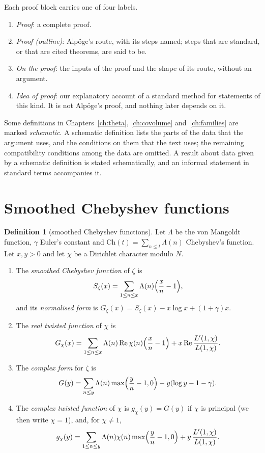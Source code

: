 \documentclass[11pt]{amsbook}
\theoremstyle{plain}
\theoremstyle{definition}
\newtheorem{definition}[theorem]{Definition}
\theoremstyle{remark}
\numberwithin{equation}{section}
\numberwithin{figure}{chapter}
\numberwithin{table}{chapter}
\newcommand{\Ch}{\mathrm{Ch}}
\newcommand{\Gz}{G_{\zeta}}
\newcommand{\Sz}{S_{\zeta}}
\begin{document}
Each proof block carries one of four labels.
\begin{enumerate}[label=(\roman*)]
\item \emph{Proof}: a complete proof.
\item \emph{Proof (outline)}: Alp\"oge's route, with its steps named;
steps that are standard, or that are cited theorems, are said to be.
\item \emph{On the proof}: the inputs of the proof and the shape of
its route, without an argument.
\item \emph{Idea of proof}: our explanatory account of a standard
method for statements of this kind. It is not Alp\"oge's proof, and
nothing later depends on it.
\end{enumerate}

Some definitions in
Chapters~\ref{ch:theta}, \ref{ch:covolume} and~\ref{ch:families}
are marked \emph{schematic}. A schematic definition lists the parts of
the data that the argument uses, and the conditions on them that the
text uses; the remaining compatibility conditions among the data are
omitted. A result about data given by a schematic definition is stated
schematically, and an informal statement in standard terms accompanies
it.

\section{Smoothed Chebyshev functions}

\begin{definition}[smoothed Chebyshev functions]\label{def:chebyshev}
Let $\Lambda$ be the von Mangoldt function, $\gamma$ Euler's constant
and $\Ch(t)=\sum_{n\le t}\Lambda(n)$ Chebyshev's function. Let $x,y>0$
and let $\chi$ be a Dirichlet character modulo $N$.
\begin{enumerate}[label=(\arabic*)]
\item The \emph{smoothed Chebyshev function} of $\zeta$ is
\[
\Sz(x)=\sum_{1\le n\le x}\Lambda(n)\Bigl(\frac{x}{n}-1\Bigr),
\]
and its \emph{normalised form} is $\Gz(x)=\Sz(x)-x\log x+(1+\gamma)x$.
\item The \emph{real twisted function} of $\chi$ is
\[
G_\chi(x)=\sum_{1\le n\le x}\Lambda(n)\operatorname{Re}\chi(n)
\Bigl(\frac{x}{n}-1\Bigr)+x\operatorname{Re}
\frac{L'(1,\chi)}{L(1,\chi)}.
\]
\item The \emph{complex form} for $\zeta$ is
\[
G(y)=\sum_{n\le y}\Lambda(n)\max\Bigl(\frac yn-1,0\Bigr)
-y(\log y-1-\gamma).
\]
\item The \emph{complex twisted function} of $\chi$ is $g_\chi(y)=G(y)$
if $\chi$ is principal (we then write $\chi=1$), and, for $\chi\ne1$,
\[
g_\chi(y)=\sum_{1\le n\le y}\Lambda(n)\chi(n)\max\Bigl(\frac{y}{n}-1,0
\Bigr)+y\,\frac{L'(1,\chi)}{L(1,\chi)}.
\]
\end{enumerate}
\end{definition}
\end{document}
